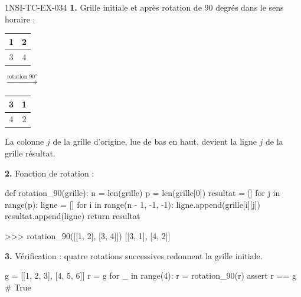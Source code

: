 \begin{corrige}{1NSI-TC-EX-034}
\textbf{1.} Grille initiale et après rotation de 90 degrés dans le sens horaire :

\begin{center}
\begin{tabular}{|c|c|}
\hline
1 & 2 \\
\hline
3 & 4 \\
\hline
\end{tabular}
\quad$\xrightarrow{\text{rotation 90°}}$\quad
\begin{tabular}{|c|c|}
\hline
3 & 1 \\
\hline
4 & 2 \\
\hline
\end{tabular}
\end{center}

La colonne $j$ de la grille d'origine, lue de bas en haut, devient la ligne $j$ de la grille résultat.

\textbf{2.} Fonction de rotation :

\begin{python}
def rotation_90(grille):
    n = len(grille)
    p = len(grille[0])
    resultat = []
    for j in range(p):
        ligne = []
        for i in range(n - 1, -1, -1):
            ligne.append(grille[i][j])
        resultat.append(ligne)
    return resultat
\end{python}

\begin{console}
>>> rotation_90([[1, 2], [3, 4]])
[[3, 1], [4, 2]]
\end{console}

\textbf{3.} Vérification : quatre rotations successives redonnent la grille initiale.

\begin{python}
g = [[1, 2, 3], [4, 5, 6]]
r = g
for _ in range(4):
    r = rotation_90(r)
assert r == g  # True
\end{python}
\end{corrige}
